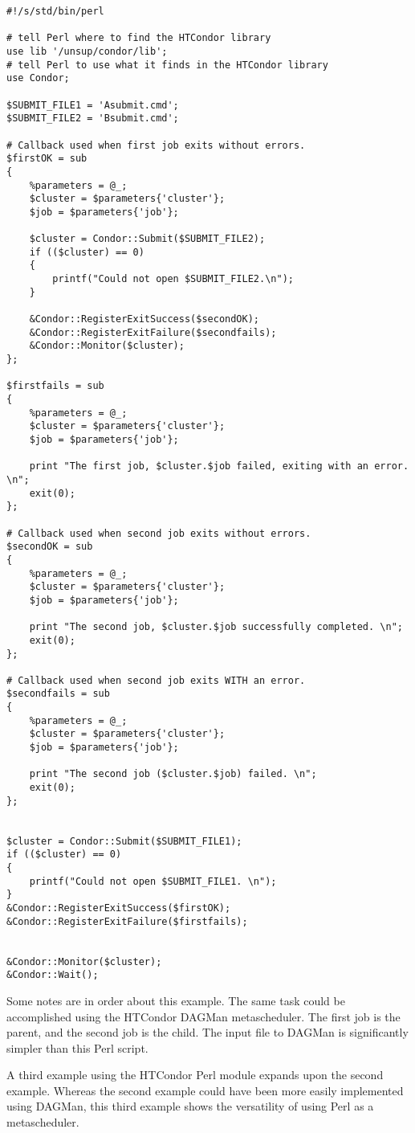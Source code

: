 \footnotesize
\begin{verbatim}
#!/s/std/bin/perl

# tell Perl where to find the HTCondor library
use lib '/unsup/condor/lib';
# tell Perl to use what it finds in the HTCondor library
use Condor;

$SUBMIT_FILE1 = 'Asubmit.cmd';
$SUBMIT_FILE2 = 'Bsubmit.cmd';

# Callback used when first job exits without errors.
$firstOK = sub
{
    %parameters = @_;
    $cluster = $parameters{'cluster'};
    $job = $parameters{'job'};

    $cluster = Condor::Submit($SUBMIT_FILE2);
    if (($cluster) == 0)
    {
        printf("Could not open $SUBMIT_FILE2.\n");
    }

    &Condor::RegisterExitSuccess($secondOK);
    &Condor::RegisterExitFailure($secondfails);
    &Condor::Monitor($cluster);
};	

$firstfails = sub
{
    %parameters = @_;
    $cluster = $parameters{'cluster'};
    $job = $parameters{'job'};

    print "The first job, $cluster.$job failed, exiting with an error. \n";
    exit(0);
};	

# Callback used when second job exits without errors.
$secondOK = sub
{
    %parameters = @_;
    $cluster = $parameters{'cluster'};
    $job = $parameters{'job'};

    print "The second job, $cluster.$job successfully completed. \n";
    exit(0);
};	

# Callback used when second job exits WITH an error.
$secondfails = sub
{
    %parameters = @_;
    $cluster = $parameters{'cluster'};
    $job = $parameters{'job'};

    print "The second job ($cluster.$job) failed. \n";
    exit(0);
};	


$cluster = Condor::Submit($SUBMIT_FILE1);
if (($cluster) == 0)
{
    printf("Could not open $SUBMIT_FILE1. \n");
}
&Condor::RegisterExitSuccess($firstOK);
&Condor::RegisterExitFailure($firstfails);


&Condor::Monitor($cluster);
&Condor::Wait();
\end{verbatim}
\normalsize

Some notes are in order about this example.
The same task could be accomplished using the HTCondor DAGMan
metascheduler.
The first job is the parent, and the second job is the child.
The input file to DAGMan is significantly simpler than this
Perl script.

A third example using the HTCondor Perl module
expands upon the second example.
Whereas the second example could have been more easily
implemented using DAGMan, this third example shows
the versatility of using Perl as a metascheduler.

